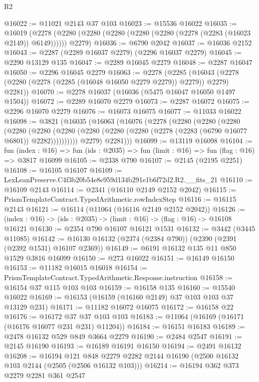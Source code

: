 \begin{lexlean}{R2}
\begin{coremodule}
@16022 := @11021 @2143 @37 @103
@16023 := @15536 @16022
@16035 := @16019
    (@2278 (@2280 (@2280 (@2280 (@2280 (@2280 (@2278 (@2283 (@16023 @2149)) @6149)))))) @2279)
@16036 := @6790 @2042
@16037 := @16036 @2152
@16043 := @2287 (@2289 @16037 @2279) (@2296 @16037 @2279)
@16045 := @2290 @13129 @135
@16047 := @2289 @16045 @2279
@16048 := @2287 @16047
@16050 := @2296 @16045 @2279
@16063 := @2278
    (@2285 (@16043 (@2278 (@2280 (@2278 (@2285 (@16048 @16050 @2279 @2279)) @2279)) @2279) @2281))
@16070 := @2278 @16037 (@16036 (@5475 @16047 @16050 @1497 @1504))
@16072 := @2289 @16070 @2279
@16073 := @2287 @16072
@16075 := @2296 @16070 @2279
@16076 := @16073 @16075
@16077 := @11033 @16022
@16098 := @3821
    (@16035
      (@16063
        (@16076
          (@2278
            (@2280
              (@2280
                (@2280
                  (@2280
                    (@2280
                      (@2280
                        (@2280 (@2280 (@2280 (@2278 (@2283 (@6790 @16077 @6801)) @2282))))))))))
            @2279)
          @2281)))
@16099 := @13119 @16098
@16104 := fun (index : @16) =>
  fun (ids : @2035) => fun (limit : @16) => fun (flag : @16) => @3817 @16099
@16105 := @2338 @790
@16107 := @2145 (@2195 @2251)
@16108 := @16105 @16107
@16109 := LexLeanPreserve.C4f3b20b54e8e959d134b291e1b6f72d2.R2.__fits_21
@16110 := @16109 @2143
@16114 := @2341 (@16110 @2149 @2152 @2042)
@16115 := PrismTemplateContract.TypedArithmetic.rowIndexStep
@16116 := @16115 @2143
@16121 := @16114 (@11064 (@16116 @2149 @2152 @2042))
@16126 := (index : @16) -> (ids : @2035) -> (limit : @16) -> (flag : @16) -> @16108 @16121
@16130 := @2354 @790 @16107 @16121 @1531
@16132 := @3442 (@3445 @11085)
@16142 := @16130 @16132 (@2374 (@2384 @790)) (@2390 (@2391 (@2392 @1531) @16107 @2369))
@16149 := @6191 @16132 @135 @11 @850 @1529 @3816 @16099
@16150 := @273 @16022
@16151 := @16149 @16150
@16153 := @11182 @16015 @16018
@16154 := PrismTemplateContract.TypedArithmetic.Response.instruction
@16158 := @16154 @37 @115 @103 @103
@16159 := @16158 @135
@16160 := @15540 @16022
@16169 := @16153 (@16159 (@16160 @2149) @37 @103 @103 @37 @13129 @231)
@16171 := @11182 @16072 @16075
@16172 := @16158 @22
@16176 := @16172 @37 @37 @103 @103
@16183 := @11064 (@16169 (@16171 (@16176 @16077 @231 @231) @11204))
@16184 := @16151 @16183
@16189 := @2478 @16132 @529 @849 @3664 @2279
@16190 := @2484 @2547
@16191 := @2145 @16190
@16193 := @16189 @16191 @16150
@16194 := @2491 @16132
@16208 := @16194
    @121
    @848
    @2279
    @2282
    @2144
    @16190
    (@2500 @16132 @103 @2144 (@2505 (@2506 @16132 @103)))
@16214 := @16194 @362 @373 @2279 @2281 @361 @2547

\end{coremodule}
\end{lexlean}

